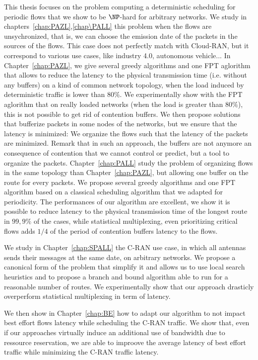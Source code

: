  This thesis focuses on the problem computing a deterministic scheduling for periodic flows that we show to be $\NP$-hard for arbitrary networks.
 We study in chapters~\ref{chap:PAZL},\ref{chap\PALL} this problem when the flows are unsychronized, that is, we can choose the emission date of the packets in the sources of the flows. This case does not perfectly match with Cloud-RAN, but it correspond to various use cases, like industry 4.0, autonomous vehicle...
In Chapter~\ref{chap:PAZL}, we give several greedy algorithms and one FPT aglorithm that allows to reduce the latency to the physical transmission time (i.e. without any buffers) on a kind of common network topology, when the load induced by deterministic traffic is lower than $80\%$. We experimentally show with the FPT aglorithm that on really loaded networks (when the load is greater than $80\%$), this is not possible to get rid of contention buffers. 
We then propose solutions that bufferize packets in some nodes of the networks, but we ensure that the latency is minimized: We organize the flows such that the latency of the packets are minimized. Remark that in such an approach, the buffers are not anymore an consequence of contention that we cannot control or predict, but a tool to organize the packets.
Chapter~\ref{chap:PALL} study the problem of organizing flows in the same topology than Chapter~\ref{chap:PAZL}, but allowing one buffer on the route for every packets. We propose several greedy algorithms and one FPT algorithm based on a classical scheduling algorithm that we adapted for periodicity. The performances of our algorithm are excellent, we show it is possible to reduce latency to the physical transmission time of the longest route in $99,9\%$ of the cases, while statistical multiplexing, even prioritizing critical flows adds $1/4$ of the period of contention buffers latency to the flows.

We study in Chapter~\ref{chap:SPALL} the C-RAN use case, in which all antennas sends their messages at the same date, on arbitrary networks. We propose a canonical form of the problem that simplify it and allows us to use local search heuristics and to propose a branch and bound algorithm able to run for a reasonable number of routes. We experimentally show that our approach drasticly overperform statistical multiplexing in term of latency.

We then show in Chapter~\ref{chap:BE} how to adapt our algorithm to not impact best effort flows latency while scheduling the C-RAN traffic. We show that, even if our approaches virtually induce an additional use of bandwidth due to ressource reservation, we are able to improove the average latency of best effort traffic while minimizing the C-RAN traffic latency.




